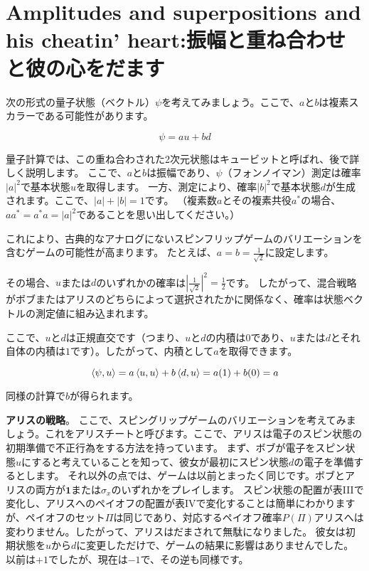 \section{Amplitudes and superpositions and his cheatin’ heart:振幅と重ね合わせと彼の心をだます}


次の形式の量子状態（ベクトル）$\psi$を考えてみましょう。ここで、$a$と$b$は複素スカラーである可能性があります。

\begin{equation}
\label{26}
\psi = au + bd
\end{equation}

量子計算では、この重ね合わされた2次元状態はキュービットと呼ばれ、後で詳しく説明します。
ここで、$a$と$b$は振幅であり、$\psi$（フォンノイマン）測定は確率$|a|^2$で基本状態$u$を取得します。
一方、測定により、確率$|b|^2$で基本状態$d$が生成されます。ここで、$|a| + |b| = 1$です。
（複素数$a$とその複素共役$a^{\ast}$の場合、$aa^{\ast} = a^{\ast} a = |a|^2$であることを思い出してください。）

これにより、古典的なアナログにないスピンフリップゲームのバリエーションを含むゲームの可能性が高まります。 たとえば、$a = b = \frac{1}{\sqrt{2}}$に設定します。

その場合、$u$または$d$のいずれかの確率は$|\frac{1}{\sqrt{2}}|^2 = \frac{1}{2}$です。 したがって、混合戦略がボブまたはアリスのどちらによって選択されたかに関係なく、確率は状態ベクトルの測定値に組み込まれます。

ここで、$u$と$d$は正規直交です（つまり、$u$と$d$の内積は$0$であり、$u$または$d$とそれ自体の内積は$1$です）。したがって、内積として$a$を取得できます。 

\begin{equation}
\label{27}
\braket{\psi, u} = a \braket{u, u} + b \braket{d, u} = a(1) +b(0) =  a
\end{equation}

同様の計算で$b$が得られます。

\textbf{アリスの戦略}。 %
ここで、スピングリップゲームのバリエーションを考えてみましょう。これをアリスチートと呼びます。ここで、アリスは電子のスピン状態の初期準備で不正行為をする方法を持っています。
まず、ボブが電子をスピン状態$u$にすると考えていることを知って、彼女が最初にスピン状態$d$の電子を準備するとします。
それ以外の点では、ゲームは以前とまったく同じです。ボブとアリスの両方が$\textbf{1}$または$\sigma_x$のいずれかをプレイします。
スピン状態の配置が表IIIで変化し、アリスへのペイオフの配置が表IVで変化することは簡単にわかりますが、ペイオフのセット$\Pi$は同じであり、対応するペイオフ確率$P(\Pi)$アリスへは変わりません。したがって、アリスはだまされて無駄になりました。
彼女は初期状態を$u$から$d$に変更しただけで、ゲームの結果に影響はありませんでした。 以前は$+1$でしたが、現在は$-1$で、その逆も同様です。

